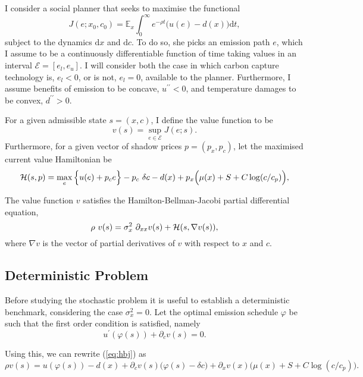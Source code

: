 \documentclass[../../main.tex]{subfiles}
\begin{document}
I consider a social planner that seeks to maximise the functional \begin{equation}
    J(e; x_0, c_0) = \mathbb{E}_{x} \int^{\infty}_0 e^{-\rho t} \Big(u(e) - d(x)\Big) \text{d} t,
\end{equation} subject to the dynamics $\text{d}x$ and $\text{d}c$. To do so, she picks an emission path $e$, which I assume to be a continuously differentiable function of time taking values in an interval $\mathcal{E} = [e_l, e_u]$. I will consider both the case in which carbon capture technology is, $e_l < 0$, or is not, $e_l = 0$, available to the planner. Furthermore, I assume benefits of emission to be concave, $u^{\prime \prime} < 0$, and temperature damages to be convex, $d^{\prime \prime} > 0$. 

For a given admissible state $s = (x, c)$, I define the value function to be \begin{equation}
    v(s) = \sup_{e \in \mathcal{E}} J(e; s).
\end{equation} Furthermore, for a given vector of shadow prices $p = (p_x, p_c)$, let the maximised current value Hamiltonian be \begin{equation}
    \mathcal{H}(s, p) = \max_e \Big\{u(e) + p_c e \Big\} - p_c \ \delta c - d(x) + p_x \Big(\mu(x) + S + C \log(c / c_p)\Big),
\end{equation} 

\begin{proposition}
    The value function $v$ satisfies the Hamilton-Bellman-Jacobi partial differential equation, \begin{equation} \label{eq:hbj}
        \rho \ v(s) = \sigma^2_x \ \partial_{x x} v(s) + \mathcal{H}(s, \nabla v(s)),
    \end{equation} where $\nabla v$ is the vector of partial derivatives of $v$ with respect to $x$ and $c$.
\end{proposition}

\subsection{Deterministic Problem}

Before studying the stochastic problem it is useful to establish a deterministic benchmark, considering the case $\sigma^2_x = 0$. Let the optimal emission schedule $\varphi$ be such that the first order condition is satisfied, namely \begin{equation}
    u^\prime\left( \varphi(s) \right) + \partial_c v(s) = 0.
\end{equation}
 
Using this, we can rewrite (\ref{eq:hbj}) as \begin{equation}
    \rho v(s) = u(\varphi(s)) - d(x) + \partial_c v(s) \Big( \varphi(s) - \delta c \Big) + \partial_x v(x) \Big(\mu(x) + S + C \log(c / c_p)\Big).
\end{equation}
\end{document}
